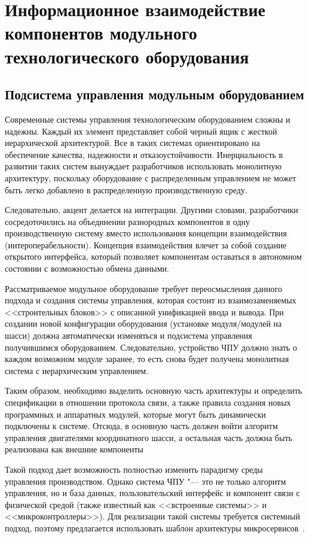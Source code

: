 \chapter{Информационное взаимодействие компонентов модульного технологического оборудования}\label{ch:ch3}

\section{Подсистема управления модульным оборудованием}\label{sec:ch3/sec1}

Современные системы управления технологическим оборудованием сложны и надежны. Каждый их элемент представляет собой черный ящик с жесткой иерархической архитектурой. Все в таких системах ориентировано на обеспечение качества, надежности и отказоустойчивости. Инерциальность в развитии таких систем вынуждает разработчиков использовать монолитную архитектуру, поскольку оборудование с распределенным управлением не может быть легко добавлено в распределенную производственную среду.

Следовательно, акцент делается на интеграции. Другими словами, разработчики сосредоточились на объединении разнородных компонентов в одну производственную систему вместо использования концепции взаимодействия (интероперабельности). Концепция взаимодействия влечет за собой создание открытого интерфейса, который позволяет компонентам оставаться в автономном состоянии с возможностью обмена данными.

Рассматриваемое модульное оборудование требует переосмысления данного подхода и создания системы управления, которая состоит из взаимозаменяемых <<строительных блоков>> с описанной унификацией ввода и вывода. При создании новой конфигурации оборудования (установке модуля/модулей на шасси) должна автоматически изменяться и подсистема управления получившимся оборудованием. Следовательно, устройство ЧПУ должно знать о каждом возможном модуле заранее, то есть снова будет получена монолитная система с иерархическим управлением.

Таким образом, необходимо выделить основную часть архитектуры и определить спецификации в отношении протокола связи, а также правила создания новых программных и аппаратных модулей, которые могут быть динамически подключены к системе. Отсюда, в основную часть должен войти алгоритм управления двигателями координатного шасси, а остальная часть должна быть реализована как внешние компоненты

Такой подход дает возможность полностью изменить парадигму среды управления производством. Однако система ЧПУ "--- это не только алгоритм управления, но и база данных, пользовательский интерфейс и компонент связи с физической средой (также известный как <<встроенные системы>> и <<микроконтроллеры>>). Для реализации такой системы требуется системный подход, поэтому предлагается использовать шаблон архитектуры микросервисов~\cite{microservices2017indin}.

